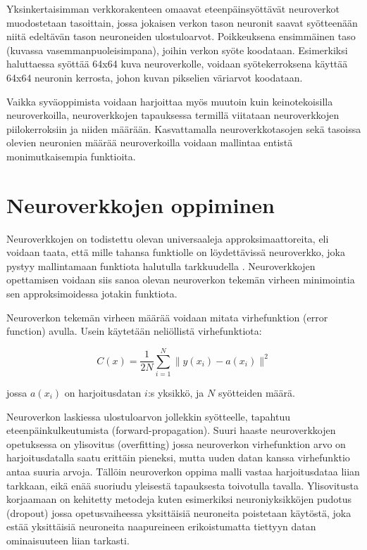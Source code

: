 \documentclass[finnish]{tktltiki2}
\theoremstyle{definition}
\theoremstyle{remark}
\begin{document}
  Yksinkertaisimman verkkorakenteen omaavat eteenpäinsyöttävät neuroverkot muodostetaan tasoittain, jossa jokaisen verkon tason neuronit saavat syötteenään niitä edeltävän tason neuroneiden ulostuloarvot. Poikkeuksena ensimmäinen taso (kuvassa vasemmanpuoleisimpana), joihin verkon syöte koodataan. Esimerkiksi haluttaessa syöttää 64x64 kuva neuroverkolle, voidaan syötekerroksena käyttää 64x64 neuronin kerrosta, johon kuvan pikselien väriarvot koodataan.

  Vaikka syväoppimista voidaan harjoittaa myös muutoin kuin keinotekoisilla neuroverkoilla, neuroverkkojen tapauksessa termillä viitataan neuroverkkojen piilokerroksiin ja niiden määrään. Kasvattamalla neuroverkkotasojen sekä tasoissa olevien neuronien määrää neuroverkoilla voidaan mallintaa entistä monimutkaisempia funktioita.

  \section{Neuroverkkojen oppiminen}

  Neuroverkkojen on todistettu olevan universaaleja approksimaattoreita, eli voidaan taata, että mille tahansa funktiolle on löydettävissä neuroverkko, joka pystyy mallintamaan funktiota halutulla tarkkuudella \cite{multilayer-feedforward-universal-approximators}. Neuroverkkojen opettamisen voidaan siis sanoa olevan neuroverkon tekemän virheen minimointia sen approksimoidessa jotakin funktiota. 
  
  Neuroverkon tekemän virheen määrää voidaan mitata virhefunktion (error function) avulla. Usein käytetään neliöllistä virhefunktiota:

    $$C(x) = \frac{1}{2N} \sum_{i=1}^{N} \| y(x_i)-a(x_i) \|^2$$

  jossa $a(x_i)$ on harjoitusdatan $i$:s yksikkö, ja $N$ syötteiden määrä.


  Neuroverkon laskiessa ulostuloarvon jollekkin syötteelle, tapahtuu eteenpäinkulkeutumista (forward-propagation). 
  Suuri haaste neuroverkkojen opetuksessa on ylisovitus (overfitting) jossa neuroverkon virhefunktion arvo on harjoitusdatalla saatu erittäin pieneksi, mutta uuden datan kanssa virhefunktio antaa suuria arvoja. Tällöin neuroverkon oppima malli vastaa harjoitusdataa liian tarkkaan, eikä enää suoriudu yleisestä tapauksesta toivotulla tavalla. Ylisovitusta korjaamaan on kehitetty metodeja kuten esimerkiksi neuroniyksikköjen pudotus (dropout) jossa opetusvaiheessa yksittäisiä neuroneita poistetaan käytöstä, joka estää yksittäisiä neuroneita naapureineen erikoistumatta tiettyyn datan ominaisuuteen liian tarkasti.
\end{document}
